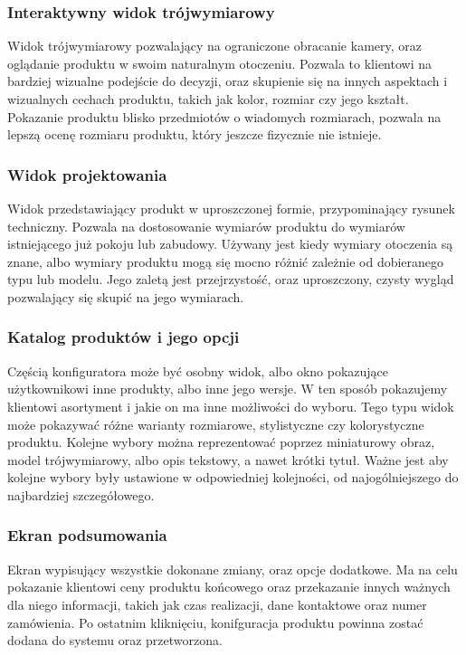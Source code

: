 \documentclass{article} %
\begin{document}
        
        \subsubsection{Interaktywny widok trójwymiarowy}
        Widok trójwymiarowy pozwalający na ograniczone obracanie kamery, oraz oglądanie produktu w swoim naturalnym otoczeniu. Pozwala to klientowi na bardziej wizualne podejście do decyzji, oraz skupienie się na innych aspektach i wizualnych cechach produktu, takich jak kolor, rozmiar czy jego kształt. Pokazanie produktu blisko przedmiotów o wiadomych rozmiarach, pozwala na lepszą ocenę rozmiaru produktu, który jeszcze fizycznie nie istnieje.
        \\
        
        \subsubsection{Widok projektowania}
        Widok przedstawiający produkt w uproszczonej formie, przypominający rysunek techniczny. Pozwala na dostosowanie wymiarów produktu do wymiarów istniejącego już pokoju lub zabudowy. Używany jest kiedy wymiary otoczenia są znane, albo wymiary produktu mogą się mocno różnić zależnie od dobieranego typu lub modelu. Jego zaletą jest przejrzystość, oraz uproszczony, czysty wygląd pozwalający się skupić na jego wymiarach.
        \\
        
        \subsubsection{Katalog produktów i jego opcji}
        Częścią konfiguratora może być osobny widok, albo okno pokazujące użytkownikowi inne produkty, albo inne jego wersje. W ten sposób pokazujemy klientowi asortyment i jakie on ma inne możliwości do wyboru. Tego typu widok może pokazywać różne warianty rozmiarowe, stylistyczne czy kolorystyczne produktu. Kolejne wybory można reprezentować poprzez miniaturowy obraz, model trójwymiarowy, albo opis tekstowy, a nawet krótki tytuł. Ważne jest aby kolejne wybory były ustawione w odpowiedniej kolejności, od najogólniejszego do najbardziej szczegółowego.
        \\
        
        \subsubsection{Ekran podsumowania}
        Ekran wypisujący wszystkie dokonane zmiany, oraz opcje dodatkowe. Ma na celu pokazanie klientowi ceny produktu końcowego oraz przekazanie innych ważnych dla niego informacji, takich jak czas realizacji, dane kontaktowe oraz numer zamówienia. Po ostatnim kliknięciu, konifguracja produktu powinna zostać dodana do systemu oraz przetworzona.
        \\
        
\end{document}
